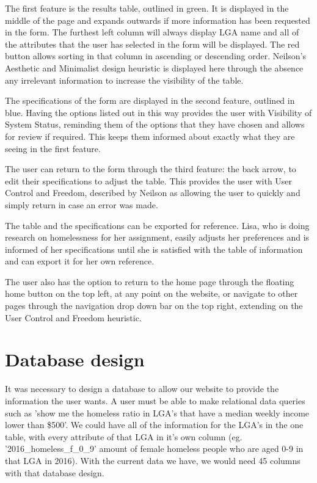 \documentclass[12pt, a4paper]{article}
\begin{document}
The first feature is the results table, outlined in green. It is displayed in the middle of the page and expands outwards if more information has been requested in the form. The furthest left column will always display LGA name and all of the attributes that the user has selected in the form will be displayed. The red button allows sorting in that column in ascending or descending order. Neilson’s Aesthetic and Minimalist design heuristic is displayed here through the absence any irrelevant information to increase the visibility of the table.

The specifications of the form are displayed in the second feature, outlined in blue. Having the options listed out in this way provides the user with Visibility of System Status, reminding them of the options that they have chosen and allows for review if required. This keeps them informed about exactly what they are seeing in the first feature.

The user can return to the form through the third feature: the back arrow, to edit their specifications to adjust the table. This provides the user with User Control and Freedom, described by Neilson as allowing the user to quickly and simply return in case an error was made.

The table and the specifications can be exported for reference. Lisa, who is doing research on homelessness for her assignment, easily adjusts her preferences and is informed of her specifications until she is satisfied with the table of information and can export it for her own reference.

The user also has the option to return to the home page through the floating home button on the top left, at any point on the website, or navigate to other pages through the navigation drop down bar on the top right, extending on the User Control and Freedom heuristic.
\section{Database design}
It was necessary to design a database to allow our website to provide the information the user wants. A user must be able to make relational data queries such as 'show me the homeless ratio in LGA's that have a median weekly income lower than \$500'. We could have all of the information for the LGA's in the one table, with every attribute of that LGA in it's own column (eg. '2016\_homeless\_f\_0\_9' amount of female homeless people who are aged 0-9 in that LGA in 2016). With the current data we have, we would need 45 columns with that database design. 
\end{document}
